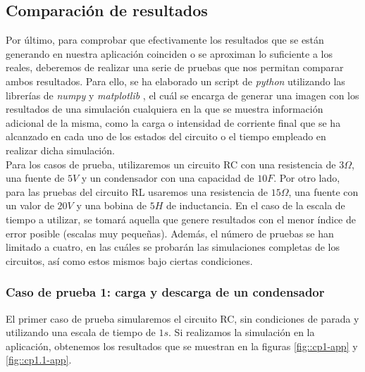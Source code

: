 \documentclass[../main.tex]{subfiles}
\begin{document}
\subsection{Comparación de resultados}
Por último, para comprobar que efectivamente los resultados que se están generando en nuestra aplicación coinciden o se aproximan lo suficiente a los reales, deberemos de realizar una serie de pruebas que nos permitan comparar ambos resultados. Para ello, se ha elaborado un script de \textit{python} utilizando las librerías de \textit{numpy} \cite{numpy} y \textit{matplotlib} \cite{matplotlib}, el cuál se encarga de generar una imagen con los resultados de una simulación cualquiera en la que se muestra información  adicional de la misma, como la carga o intensidad de corriente final que se ha alcanzado en cada uno de los estados del circuito o el tiempo empleado en realizar dicha simulación.\\ 


Para los casos de prueba, utilizaremos un circuito RC con una resistencia de $3\Omega$, una fuente de $5V$ y un condensador con una capacidad de $10F$. Por otro lado, para las pruebas del circuito RL usaremos una resistencia de $15\Omega$, una fuente con un valor de $20V$ y una bobina de $5H$ de inductancia. En el caso de la escala de tiempo a utilizar, se tomará aquella que genere resultados con el menor índice de error posible (escalas muy pequeñas). Además, el número de pruebas se han limitado a cuatro, en las cuáles se probarán las simulaciones completas de los circuitos, así como estos mismos bajo ciertas condiciones.\\



\subsubsection{Caso de prueba 1: carga y descarga de un condensador}

El primer caso de prueba simularemos el circuito RC, sin condiciones de parada y utilizando una escala de tiempo de $1s$. Si realizamos la simulación en la aplicación, obtenemos los resultados que se muestran en la figuras \ref{fig::cp1-app} y \ref{fig::cp1.1-app}. \\
\end{document}
